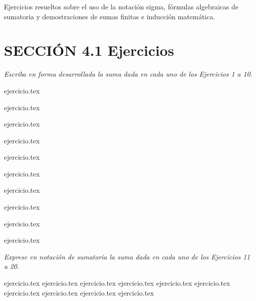 
Ejercicios resueltos sobre el uso de la notación sigma, fórmulas algebraicas de sumatoria y demostraciones de sumas finitas e inducción matemática.

\section*{SECCIÓN 4.1 \quad Ejercicios}

\noindent \textit{Escriba en forma desarrollada la suma dada en cada uno de los Ejercicios 1 a 10.}

\begin{enumerate}
    \begin{minipage}{0.45\textwidth}
    {ejercicio.tex}
    \addtocounter{enumi}{1}
    {ejercicio.tex}
    \addtocounter{enumi}{1}
    {ejercicio.tex}
    \addtocounter{enumi}{1}
    {ejercicio.tex}
    \addtocounter{enumi}{1}
    {ejercicio.tex}
    \end{minipage}%
    \begin{minipage}{0.45\textwidth}
    \setcounter{enumi}{1}
    {ejercicio.tex}
    \addtocounter{enumi}{1}
    {ejercicio.tex}
    \addtocounter{enumi}{1}
    {ejercicio.tex}
    \addtocounter{enumi}{1}
    {ejercicio.tex}
    \addtocounter{enumi}{1}
    {ejercicio.tex}
    \end{minipage}
\end{enumerate}

\vspace{1em}
\noindent \textit{Exprese en notación de sumatoria la suma dada en cada uno de los Ejercicios 11 a 20.}

\begin{enumerate}
    \setcounter{enumi}{10}
    {ejercicio.tex}
    {ejercicio.tex}
    {ejercicio.tex}
    {ejercicio.tex}
    {ejercicio.tex}
    {ejercicio.tex}
    {ejercicio.tex}
    {ejercicio.tex}
    {ejercicio.tex}
    {ejercicio.tex}
\end{enumerate}

